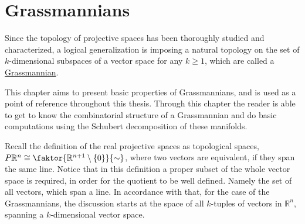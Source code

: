 \chapter{Grassmannians}
Since the topology of projective spaces has been thoroughly studied and characterized, a logical generalization is imposing a natural topology on the set of $k$-dimensional subspaces of a vector space for any $k\geq1$, which are called a \ul{Grassmannian}.

This chapter aims to present basic properties of Grassmannians, and is used as a point of reference throughout this thesis.
Through this chapter the reader is able to get to know the combinatorial structure of a Grassmannian and do basic computations using the Schubert decomposition of these manifolds.

Recall the definition of the real projective spaces as topological spaces,
$P\mathbb{R}^n\cong\faktor{\mathbb{R}^{n+1}\setminus\{0\}}{\sim}$,
where two vectors are equivalent, if they span the same line. Notice that in this definition a proper subset of the whole vector space is required, in order for the quotient to be well defined. Namely the set of all vectors, which span a line. In accordance with that, for the case of the Grassmannians, the discussion starts at the space of all $k$-tuples of vectors in $\mathbb{R}^n$, spanning a $k$-dimensional vector space.

